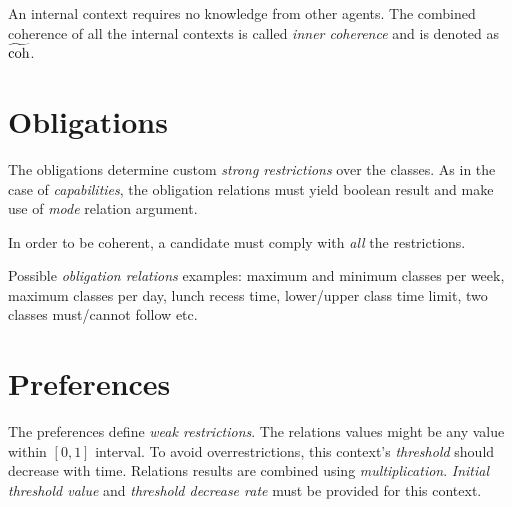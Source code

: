 \documentclass[../ThesisDoc]{subfiles}
\begin{document}
\providecommand{\rootdir}{..}
\providecommand{\seccmd}[1]{\section{#1}}

An internal context requires no knowledge from other agents.
The combined coherence of all the internal contexts is called
\emph{inner coherence} and is denoted as $\mathrm{\widetilde{coh}}$.

\seccmd{Obligations}

The obligations determine custom \emph{strong restrictions} over the classes.
As in the case of \emph{capabilities}, the obligation relations must yield
boolean result and make use of \emph{mode} relation argument.

In order to be coherent, a candidate must comply with \emph{all} the restrictions.

\medskip

Possible \emph{obligation relations} examples:
maximum and minimum classes per week, maximum classes per day,
lunch recess time, lower/upper class time limit, two classes must/cannot follow etc.


\seccmd{Preferences}

The preferences define \emph{weak restrictions}. The relations values might be any
value within $[0,1]$ interval. To avoid overrestrictions, this context's \emph{threshold}
should decrease with time. Relations results are combined using \emph{multiplication}.
\emph{Initial threshold value} and \emph{threshold decrease rate} must be
provided for this context.

\end{document}
